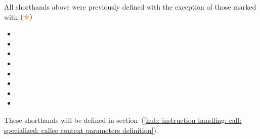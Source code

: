 All shorthands above were previously defined with the exception of those marked with $(\textcolor{draculaorange}{\bigstar})$
\begin{multicols}{2}
	\begin{itemize}
		\item {}
		\item {}
		\item {}
		\item {}
		\item {}
		\item {}
		\item {}
		\item[\vspace{\fill}]
	\end{itemize}
\end{multicols}
\noindent These shorthands will be defined in section~(\ref{hub: instruction handling: call: specialized: callee context parameters definition}).
